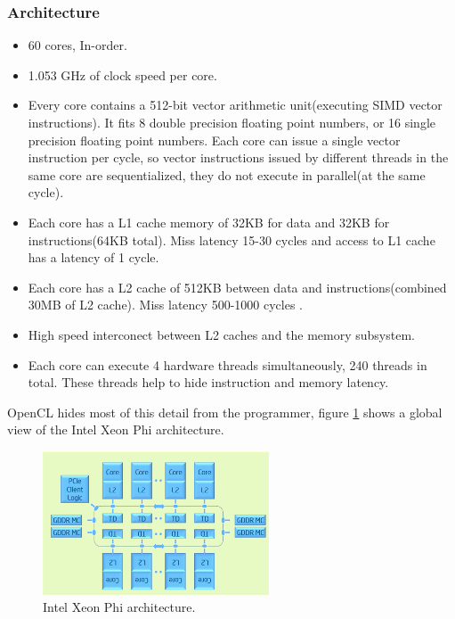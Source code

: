 \subsubsection{Architecture}
\begin{itemize}
    \item 60 cores, In-order\cite{phi_specs}.
    \item 1.053 GHz of clock speed per core\cite{phi_specs}.
    \item Every core contains a 512-bit vector arithmetic unit(executing SIMD vector instructions). It fits 8 double precision 
        floating point numbers, or 16 single precision floating point numbers. Each core can issue a single vector instruction per
        cycle\cite{opencl_phi}, so vector instructions issued by different threads in the same core are sequentialized, they do 
        not execute in parallel(at the same cycle).
    \item Each core has a L1 cache memory of 32KB for data and 32KB for instructions(64KB total). Miss latency 15-30
        cycles and access to L1 cache has a latency of 1 cycle\cite{opencl_phi}.
    \item Each core has a L2 cache of 512KB between data and instructions(combined 30MB of L2 cache). Miss latency 500-1000 cycles
        \cite{opencl_phi,phi_specs}.
    \item High speed interconect between L2 caches and the memory subsystem\cite{opencl_phi}.
    \item Each core can execute 4 hardware threads simultaneously, 240 threads in total. These threads help to hide 
        instruction and memory latency\cite{opencl_phi}.
\end{itemize}

\par{OpenCL hides most of this detail from the programmer, figure \ref{PhiArch} shows a global view of the Intel Xeon Phi 
    architecture.\cite{opencl_phi}}

\begin{figure}[!h]
    \centering
    \includegraphics[width=0.6\textwidth]{figures/phi_arch.png}
    \caption{Intel Xeon Phi architecture\cite{opencl_phi}.}
    \label{PhiArch}
\end{figure}


